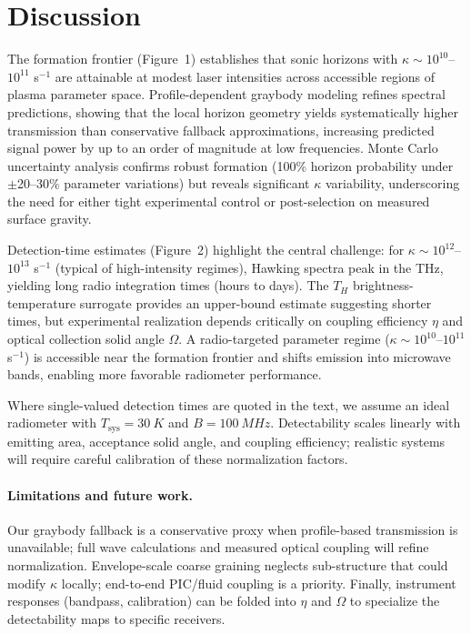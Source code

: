 \documentclass[11pt]{article}
\begin{document}
\section{Discussion}
The formation frontier (Figure~1) establishes that sonic horizons with $\kappa \sim 10^{10}$--$10^{11}$ s$^{-1}$ are attainable at modest laser intensities across accessible regions of plasma parameter space. Profile-dependent graybody modeling refines spectral predictions, showing that the local horizon geometry yields systematically higher transmission than conservative fallback approximations, increasing predicted signal power by up to an order of magnitude at low frequencies. Monte Carlo uncertainty analysis confirms robust formation (100\% horizon probability under $\pm$20--30\% parameter variations) but reveals significant $\kappa$ variability, underscoring the need for either tight experimental control or post-selection on measured surface gravity.

Detection-time estimates (Figure~2) highlight the central challenge: for $\kappa \sim 10^{12}$--$10^{13}$ s$^{-1}$ (typical of high-intensity regimes), Hawking spectra peak in the THz, yielding long radio integration times (hours to days). The $T_H$ brightness-temperature surrogate provides an upper-bound estimate suggesting shorter times, but experimental realization depends critically on coupling efficiency $\eta$ and optical collection solid angle $\Omega$. A radio-targeted parameter regime ($\kappa \sim 10^{10}$--$10^{11}$ s$^{-1}$) is accessible near the formation frontier and shifts emission into microwave bands, enabling more favorable radiometer performance.

Where single-valued detection times are quoted in the text, we assume an ideal radiometer with $T_{\mathrm{sys}}=\SI{30}{K}$ and $B=\SI{100}{MHz}$. Detectability scales linearly with emitting area, acceptance solid angle, and coupling efficiency; realistic systems will require careful calibration of these normalization factors.

\paragraph{Limitations and future work.}
Our graybody fallback is a conservative proxy when profile-based transmission is unavailable; full wave calculations and measured optical coupling will refine normalization. Envelope-scale coarse graining neglects sub-structure that could modify $\kappa$ locally; end-to-end PIC/fluid coupling is a priority. Finally, instrument responses (bandpass, calibration) can be folded into $\eta$ and $\Omega$ to specialize the detectability maps to specific receivers.
\end{document}
